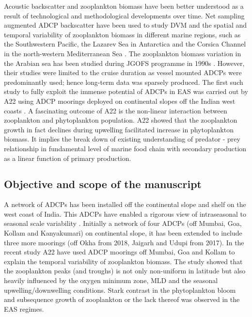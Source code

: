 \documentclass{article}
\begin{document}
	Acoustic backscatter and zooplankton biomass have been better understood as a result of technological and methodological developments over time. Net sampling augmented ADCP backscatter have been used to study DVM and the spatial and temporal variability of zooplankton biomass in different marine regions, such as the Southwestern Pacific, the Lazarev Sea in Antarctica and the Corsica Channel in the north-western Mediterranean Sea \citep{cisewski2010seasonal,hamilton2013links,smeti2015spatial, guerra2019zooplankton}.	The zooplankton biomass variation in the Arabian sea has been studied during JGOFS programme in 1990s \citep{herring1998across, nair1999arabian, barber2001qn,fielding2004biological, smith2005mesozooplankton}. However, their studies were limited to the cruise duration as vessel mounted ADCPs were predominantly used; hence long-term data was sparsely produced. The first such study to fully exploit the immense potential of ADCPs in EAS was carried out by A22 using ADCP moorings deployed on continental slopes off the Indian west coasts \citep{amol2014observed, chaudhuri2020observed}. A fascinating outcome of A22 is the non-linear interaction between zooplankton and phytoplankton population. A22 showed that the zooplankton growth in fact declines during upwelling facilitated increase in phytoplankton biomass. It implies the break down of existing understanding of predator - prey relationship in fundamental level of marine food chain with secondary production as a linear function of primary production.
	
	
	\subsection{Objective and scope of the manuscript}
	
	A network of ADCPs has been installed off the continental slope and shelf on the west coast of India. This ADCPs have enabled a rigorous view of intraseasonal to seasonal scale variability \citep{amol2014observed, chaudhuri2020observed}. Initially a network of four ADCPs (off Mumbai, Goa, Kollam and Kanyakumari) on continental slope, it has been extended to include three more moorings (off Okha from 2018, Jaigarh and Udupi from 2017). In the recent study A22 have used ADCP moorings off  Mumbai, Goa and Kollam to explain the temporal variability of zooplankton biomass. The study showed that the zooplankton peaks (and troughs) is not only non-uniform in latitude but also heavily influenced by the oxygen minimum zone, MLD and the seasonal upwelling/downwelling conditions. Stark contrast in the phytoplankton bloom and subsequence  growth of zooplankton or the lack thereof was observed in the EAS regimes.
\end{document}

